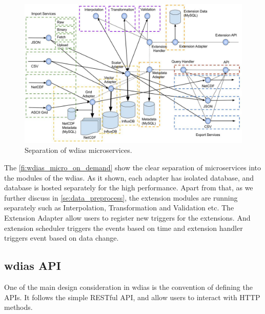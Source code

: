 \begin{figure}[htp]
    \centering
    \includegraphics[width=1\textwidth]{method/microservice/separation_microservices-v3.jpg}
    \caption{Separation of \acrshort{wdias} microservices.}
    \label{fi:wdias_micro_separation}
\end{figure}
The \cref{fi:wdias_micro_on_demand} show the clear separation of microservices into the modules of the \acrshort{wdias}. As it shown, each adapter has isolated database, and database is hosted separately for the high performance.
Apart from that, as we further discuss in \cref{se:data_preprocess}, the extension modules are running separately such as Interpolation, Transformation and Validation etc.
The Extension Adapter allow users to register new triggers for the extensions. And extension scheduler triggers the events based on time and extension handler triggers event based on data change.


\subsection{\acrshort{wdias} API}
\label{sebse:wdias_api}
One of the main design consideration in \acrshort{wdias} is the convention of defining the APIs. It follows the simple RESTful API, and allow users to interact with HTTP methods.


